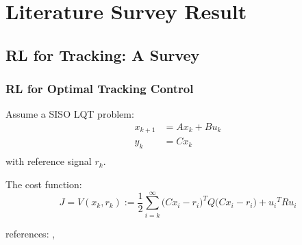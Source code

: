 \documentclass{beamer}
\begin{document}
			\section{Literature Survey Result}				
			\subsection{RL for Tracking: A Survey}
			\begin{frame}\frametitle{RL for Optimal Tracking Control}
				
				Assume a SISO LQT problem: \\
				\begin{equation} 
				\begin{split}
				x_{k+1} &= Ax_k + Bu_k \\
				y_k &= Cx_k \\
				\end{split}
				\end{equation}		
				with reference signal $ r_k $. \\
				\vspace{1mm}
				\begin{definition}
					The cost function:
					\begin{equation}
					J = V(x_k, r_k) := \frac{1}{2} \sum_{i=k}^{\infty} \Big(Cx_i-r_i\Big)^TQ\Big(Cx_i-r_i\Big) + {u_i}^TRu_i
					\end{equation}
				\end{definition}
				\vspace{2mm}
				\centering
				\fontsize{8}{4}\selectfont	references: \citet{Kiumarsi6918527}, \cite{Modares20141780}			
			\end{frame}
			
%				
			
\end{document}

